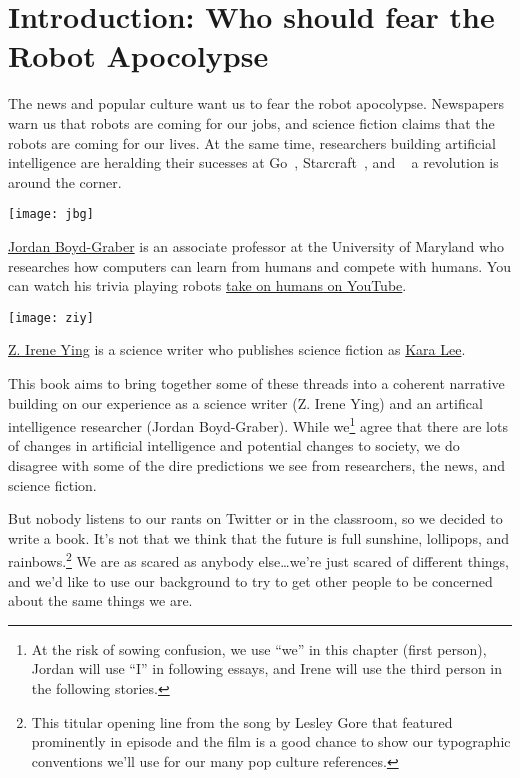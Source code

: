 \cleardoublepage
\chapter{Introduction: Who should fear the Robot Apocolypse}


The news and popular culture want us to fear the robot apocolypse.  Newspapers warn us that robots are coming for our jobs, and science fiction claims that the robots are coming for our lives.  At the same time, researchers building artificial intelligence are heralding their sucesses at Go~\cite{silver-16}, Starcraft~\cite{vinyals2017starcraft}, and ~\cite{ferruci-10} a revolution is around the corner.

\begin{marginfigure}%
  \texttt{[image: jbg]}
  \caption{\href{http://boydgraber.org}{Jordan Boyd-Graber} is an associate professor at the University of Maryland who researches how computers can learn from humans and compete with humans.  You can watch his trivia playing robots \href{http://qanta.org/home/past-events}{take on humans on YouTube}.}
  \label{fig:marginfig}
\end{marginfigure}

\begin{marginfigure}%
  \texttt{[image: ziy]}
  \caption{\href{http://www.ireneying.net/}{Z. Irene Ying} is a science writer who publishes science fiction as \href{http://www.windupdreams.net/}{Kara Lee}.}
  \label{fig:marginfig}
\end{marginfigure}

This book aims to bring together some of these threads into a coherent
narrative building on our experience as a science writer (Z. Irene
Ying) and an artifical intelligence researcher (Jordan Boyd-Graber).
While we\footnote{At the risk of sowing confusion, we use ``we'' in this
chapter (first person), Jordan will use ``I'' in following essays, and
Irene will use the third person in the following stories.} agree that
there are lots of changes in artificial intelligence and potential
changes to society, we do disagree with some of the dire predictions
we see from researchers, the news, and science fiction.

But nobody listens to our rants on Twitter or in the classroom, so we
decided to write a book.  It's not that we think that the future is
full sunshine, lollipops, and rainbows.\footnote{This titular opening
line from the song  by Lesley
Gore that featured prominently in 
episode  and the film  is a good chance to show our typographic
conventions we'll use for our many pop culture references.}  We are as
scared as anybody else\dots we're just scared of different things, and
we'd like to use our background to try to get other people to be
concerned about the same things we are.

